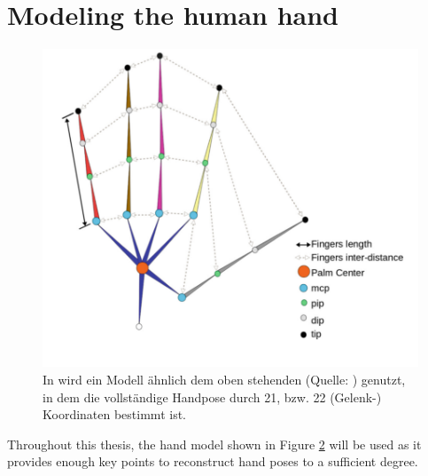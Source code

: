 	\begin{figure}
		\centering
		\fontsize{7.5pt}{11pt}\selectfont%
		\begin{subfigure}[c]{0.4\textwidth}
			\centering
			\def\svgwidth{\textwidth}
			
		\end{subfigure}
		\begin{subfigure}[c]{0.4\textwidth}
			\centering
			\def\svgwidth{\textwidth}
			
		\end{subfigure}
		\caption{}
		\label{fig:simpleperceptron}
	\end{figure}
	
	
\section { Modeling the human hand }
	
	\begin{figure}
		\centering
		\includegraphics[width=0.7\linewidth]{Ressourcen/malik2018_hand_model}
		\caption[Handmodell nach \cite{Malik2018b}]{In \cite{Malik2018b} wird ein Modell ähnlich dem oben stehenden (Quelle: \cite{Malik2018b}) genutzt, in dem die vollständige Handpose durch 21, bzw. 22 (Gelenk-) Koordinaten bestimmt ist.}
		\label{fig:malik2018handmodel}
	\end{figure}
	Throughout this thesis, the hand model shown in Figure \ref{fig:malik2018handmodel} will be used as it provides enough key points to reconstruct hand poses to a sufficient degree.
	
